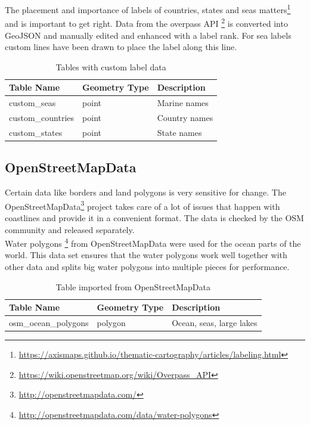 The placement and importance of labels of countries, states and seas matters\footnote{\url{https://axismaps.github.io/thematic-cartography/articles/labeling.html}} and is important to get right. Data from the overpass API \footnote{\url{https://wiki.openstreetmap.org/wiki/Overpass_API}} is converted into GeoJSON and
manually edited and enhanced with a label rank. For sea labels custom lines have been drawn to place the label along this line.

\begin{table}[H]
\centering
    \begin{tabular}{lll}
    \hline
    Table Name   & Geometry Type & Description \\
    \hline                                          
    custom\_seas       & point    & Marine names \\
    custom\_countries    & point    & Country names \\
    custom\_states       & point    & State names \\
    \end{tabular}
    \caption{Tables with custom label data}
\end{table}

\subsection{OpenStreetMapData}

Certain \osm{} data like borders and land polygons is very sensitive for change.
The OpenStreetMapData\footnote{\url{http://openstreetmapdata.com/}}
project takes care of a lot of issues that happen with coastlines
and provide it in a convenient format. The data is checked by the OSM community
and released separately.
\\
Water polygons  \footnote{\url{http://openstreetmapdata.com/data/water-polygons}} from OpenStreetMapData were used for the ocean parts of the world. This data set ensures that the water polygons
work well together with other \osm{} data and splits big water polygons into multiple 
pieces for performance.

\begin{table}[H]
\centering
    \begin{tabular}{lll}
    \hline
    Table Name            & Geometry Type & Description \\
    \hline
    osm\_ocean\_polygons        & polygon       & Ocean, seas, large lakes           \\
    \end{tabular}
    \caption{Table imported from OpenStreetMapData}
\end{table}

